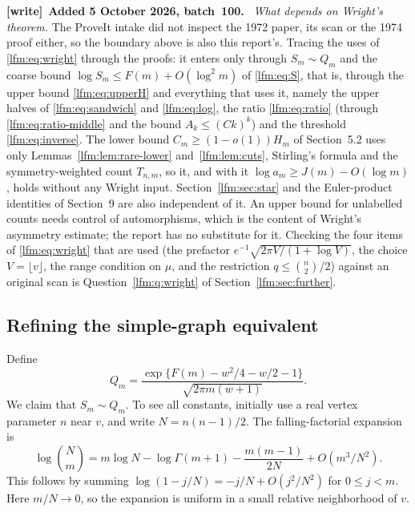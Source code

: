 \documentclass[11pt,letterpaper]{article}
\theoremstyle{remark}\newtheorem{remark}[theorem]{Remark}
\newenvironment{writenote}[1][]{\par\smallskip\begingroup\small
 \noindent\textbf{[write]}\if\relax\detokenize{#1}\relax\else~\textbf{#1.}\fi\ }%
 {\par\endgroup\smallskip}
\begin{document}
\begin{writenote}[Added 5 October 2026, batch~100]
\emph{What depends on Wright's theorem.} The ProveIt intake did not inspect
the 1972 paper, its scan or the 1974 proof either, so the boundary above is
also this report's. Tracing the uses of \eqref{lfm:eq:wright} through the
proofs: it enters only through $S_m\sim Q_m$ and the coarse bound
$\log S_m\le F(m)+O(\log^2m)$ of \eqref{lfm:eq:S}, that is, through the upper
bound \eqref{lfm:eq:upperH} and everything that uses it, namely the upper
halves of \eqref{lfm:eq:sandwich} and \eqref{lfm:eq:log}, the ratio
\eqref{lfm:eq:ratio} (through \eqref{lfm:eq:ratio-middle} and the bound
$A_k\le(Ck)^k$) and the threshold \eqref{lfm:eq:inverse}. The lower bound
$C_m\ge(1-o(1))H_m$ of Section~5.2 uses only Lemmas~\ref{lfm:lem:rare-lower}
and~\ref{lfm:lem:cuts}, Stirling's formula and the symmetry-weighted count
$T_{n,m}$, so it, and with it $\log a_m\ge J(m)-O(\log m)$, holds without
any Wright input. Section~\ref{lfm:sec:star} and the Euler-product
identities of Section~9 are also independent of it. An upper bound for
unlabelled counts needs control of automorphisms, which is the content of
Wright's asymmetry estimate; the report has no substitute for it.
Checking the four items of \eqref{lfm:eq:wright} that are used (the prefactor
$e^{-1}\sqrt{2\pi V/(1+\log V)}$, the choice $V=\lfloor v\rfloor$, the range
condition on $\mu$, and the restriction $q\le\binom n2/2$) against an
original scan is Question~\ref{lfm:q:wright} of
Section~\ref{lfm:sec:further}.
\end{writenote}

\subsection{Refining the simple-graph equivalent}
Define
\begin{equation}
 Q_m=\frac{\exp\{F(m)-w^2/4-w/2-1\}}
 {\sqrt{2\pi m(w+1)}}.\label{lfm:eq:Q}
\end{equation}
We claim that $S_m\sim Q_m$. To see all constants, initially use a real vertex parameter $n$ near $v$, and write $N=n(n-1)/2$. The falling-factorial expansion is
\begin{equation}
 \log\binom Nm=m\log N-\log\Gamma(m+1)
 -\frac{m(m-1)}{2N}+O(m^3/N^2).\label{lfm:eq:falling}
\end{equation}
This follows by summing $\log(1-j/N)=-j/N+O(j^2/N^2)$ for $0\le j<m$. Here $m/N\to0$, so the expansion is uniform in a small relative neighborhood of $v$.
\end{document}

